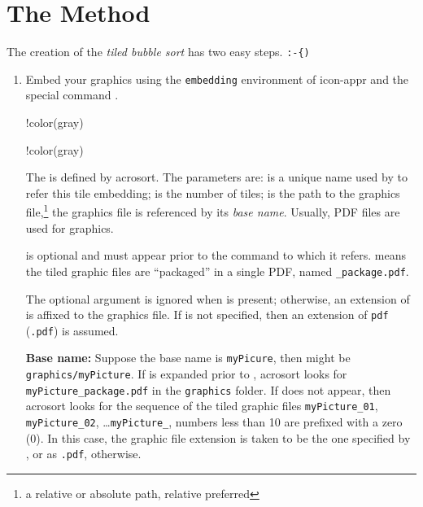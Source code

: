 \documentclass{article}
\let\pkg\textsf
\let\env\texttt
\begin{document}
\section{The Method}

The creation of the \emph{tiled bubble sort} has two easy steps. \verb~:-{)~
\begin{enumerate}
  \item Embed your graphics using the \env{embedding} environment of \pkg{icon-appr} and the special
  command .
\bVerb{}
\begin{dCmd}[commandchars=!()]{\bxSize}
!color(gray)\begin{embedding}
\isPackage
{}
!color(gray)\end{embedding}
\end{dCmd}
\eVerb
The  is defined by \pkg{acrosort}. The parameters are:
 is a unique name used by  to refer this tile
embedding;  is the number of tiles;  is the
path to the graphics file,\footnote{a relative or absolute path, relative
preferred} the graphics file is referenced by its \emph{base name}.
Usually, PDF files are used for graphics.

 is optional and must appear prior to the 
command to which it refers.  means the tiled graphic files
are ``packaged'' in a single PDF, named
\texttt{\_package.pdf}.

The optional argument  is ignored when  is
present; otherwise, an extension of  is affixed to the graphics
file. If  is not specified, then an extension of \texttt{pdf}
(\texttt{.pdf}) is assumed.

\textbf{Base name:} Suppose the base name is \texttt{myPicure}, then
 might be \texttt{graphics/\allowbreak myPicture}. If
 is expanded prior to , \pkg{acrosort} looks
for \texttt{myPicture\_package.pdf} in the \texttt{graphics} folder. If
 does not appear, then \pkg{acrosort} looks for the sequence
of the tiled graphic files \texttt{myPicture\_01}, \texttt{myPicture\_02},
\dots \texttt{myPicture\_}, numbers less than 10 are
prefixed with a zero (0). In this case, the graphic file extension is taken
to be the one specified by , or as \texttt{.pdf}, otherwise.


\end{enumerate}
\end{document}
